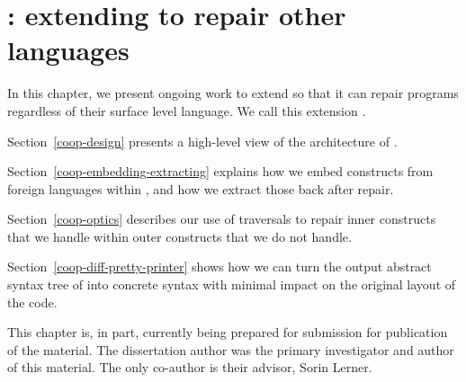 \chapter{\Coop{}: extending \Chick{} to repair other languages}\label{coop}

In this chapter, we present ongoing work to extend \Chick{} so that it can
repair programs regardless of their surface level language.  We call this
extension \Coop{}.

Section~\ref{coop-design} presents a high-level view of the architecture of
\Coop{}.

Section~\ref{coop-embedding-extracting} explains how we embed constructs from
foreign languages within \Chick{}, and how we extract those back after repair.

Section~\ref{coop-optics} describes our use of traversals to repair inner
constructs that we handle within outer constructs that we do not handle.

Section~\ref{coop-diff-pretty-printer} shows how we can turn the output abstract
syntax tree of \Coop{} into concrete syntax with minimal impact on the original
layout of the code.






This chapter is, in part, currently being prepared for submission for
publication of the material.  The dissertation author was the primary
investigator and author of this material.  The only co-author is their advisor,
Sorin Lerner.
